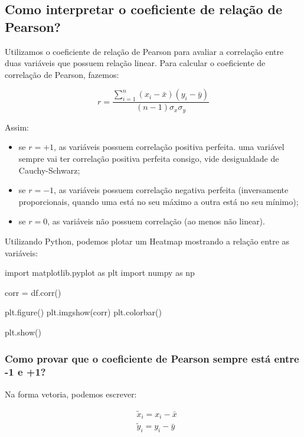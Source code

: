 \documentclass{article}
\begin{document}
\subsection{Como interpretar o coeficiente de relação de Pearson?}

Utilizamos o coeficiente de relação de Pearson para avaliar a correlação entre duas variáveis que possuem relação linear. Para calcular o coeficiente de correlação de Pearson, fazemos:

\begin{equation}
    r = \frac{\displaystyle \sum_{i = 1}^{n}(x_i - \bar{x})(y_i - \bar{y})} {(n - 1)\sigma_x\sigma_y}
\end{equation}

Assim:

\begin{itemize}
    \item se $r = + 1$, as variáveis possuem correlação positiva perfeita. uma variável sempre vai ter correlação positiva perfeita consigo, vide desigualdade de Cauchy-Schwarz;
    \item se $r = - 1$, as variáveis possuem correlação negativa perfeita (inversamente proporcionais, quando uma está no seu máximo a outra está no seu mínimo);
    \item se $r = 0$, as variáveis não possuem correlação (ao menos não linear).
\end{itemize}

Utilizando Python, podemos plotar um Heatmap mostrando a relação entre as variáveis:

\begin{pythoncode}
import matplotlib.pyplot as plt
import numpy as np

corr = df.corr()

plt.figure()
plt.imgshow(corr)
plt.colorbar()

plt.show()
\end{pythoncode}

\subsubsection{Como provar que o coeficiente de Pearson sempre está entre -1 e +1?}

Na forma vetoria, podemos escrever:

\begin{align*}
    &\tilde{x}_{i} = x_i - \bar{x} \\
    &\tilde{y}_{i} = y_i - \bar{y}
\end{align*}
\end{document}
